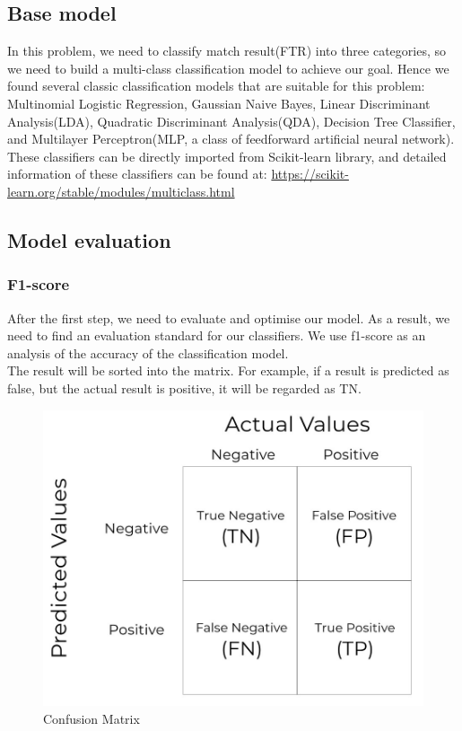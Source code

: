 \documentclass{article}
\begin{document}
\subsection{Base model}
In this problem, we need to classify match result(FTR) into three categories, so we need to build a multi-class classification model to achieve our goal. Hence we found several classic classification models that are suitable for this problem: Multinomial Logistic Regression, Gaussian Naive Bayes, Linear Discriminant Analysis(LDA), Quadratic Discriminant Analysis(QDA), Decision Tree Classifier, and Multilayer Perceptron(MLP, a class of feedforward artificial neural network). These classifiers can be directly imported from Scikit-learn library, and detailed information of these classifiers can be found at:  \url{https://scikit-learn.org/stable/modules/multiclass.html}\\
\subsection{Model evaluation}
\subsubsection{F1-score}
After the first step, we need to evaluate and optimise our model. As a result, we need to find an evaluation standard for our classifiers. We use f1-score as an analysis of the accuracy of the classification model. \\
The result will be sorted into the matrix. For example, if a result is predicted as false, but the actual result is positive, it will be regarded as TN. 
\begin{figure}[ht]
\centering
\includegraphics[scale=0.1]{graphs/confusion_matrix.jpeg}
\caption{Confusion Matrix\cite{6}}
\label{fig:confusion_matrix}
\end{figure}
\end{document}
